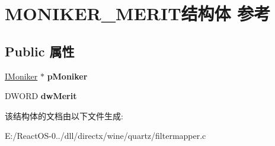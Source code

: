 \hypertarget{struct_m_o_n_i_k_e_r___m_e_r_i_t}{}\section{M\+O\+N\+I\+K\+E\+R\+\_\+\+M\+E\+R\+I\+T结构体 参考}
\label{struct_m_o_n_i_k_e_r___m_e_r_i_t}
\subsection*{Public 属性}
\begin{DoxyCompactItemize}
\item 
\mbox{\label{struct_m_o_n_i_k_e_r___m_e_r_i_t_af60bf5488c0ffd94a053454260c70dea}} 
\hyperlink{interface_i_moniker}{I\+Moniker} $\ast$ {\bfseries p\+Moniker}
\item 
\mbox{\label{struct_m_o_n_i_k_e_r___m_e_r_i_t_a79f6c440d3f63fc682c1107e027bc1ad}} 
D\+W\+O\+RD {\bfseries dw\+Merit}
\end{DoxyCompactItemize}


该结构体的文档由以下文件生成\+:\begin{DoxyCompactItemize}
\item 
E\+:/\+React\+O\+S-\/0../dll/directx/wine/quartz/filtermapper.\+c\end{DoxyCompactItemize}
